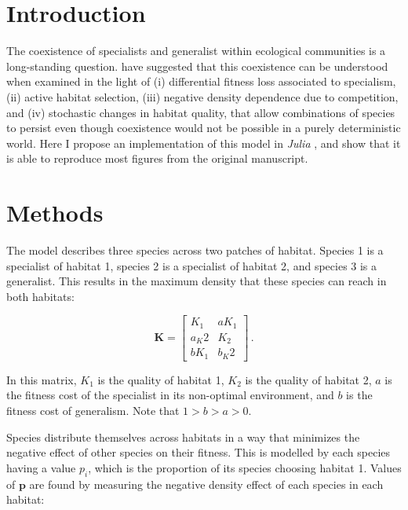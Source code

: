 \documentclass[10pt,a4paper,onecolumn]{article}
\begin{document}
\section{Introduction}\label{introduction}

The coexistence of specialists and generalist within ecological
communities is a long-standing question. \textcite{wils94csg} have
suggested that this coexistence can be understood when examined in the
light of (i) differential fitness loss associated to specialism, (ii)
active habitat selection, (iii) negative density dependence due to
competition, and (iv) stochastic changes in habitat quality, that allow
combinations of species to persist even though coexistence would not be
possible in a purely deterministic world. Here I propose an
implementation of this model in \emph{Julia} \autocite{beza17jfa}, and
show that it is able to reproduce most figures from the original
manuscript.

\section{Methods}\label{methods}

The \textcite{wils94csg} model describes three species across two
patches of habitat. Species 1 is a specialist of habitat 1, species 2 is
a specialist of habitat 2, and species 3 is a generalist. This results
in the maximum density that these species can reach in both habitats:

\begin{equation}
\mathbf{K} = \begin{bmatrix}
  K_1 & aK_1 \\
  a_K2 & K_2 \\
  bK_1 & b_K2
\end{bmatrix} \,.
\end{equation}

In this matrix, \(K_1\) is the quality of habitat 1, \(K_2\) is the
quality of habitat 2, \(a\) is the fitness cost of the specialist in its
non-optimal environment, and \(b\) is the fitness cost of generalism.
Note that \(1 > b > a > 0\).

Species distribute themselves across habitats in a way that minimizes
the negative effect of other species on their fitness. This is modelled
by each species having a value \(p_i\), which is the proportion of its
species choosing habitat 1. Values of \(\mathbf{p}\) are found by
measuring the negative density effect of each species in each habitat:
\end{document}
